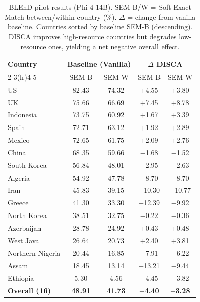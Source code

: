 \documentclass{article}
\newcommand{\gain}[1]{\textcolor{improvegreen}{#1}}
\begin{document}
\begin{table}[h]\centering\scriptsize
\caption{BLEnD pilot results (Phi-4 14B). SEM-B/W = Soft Exact Match between/within country (\%). $\Delta$ = change from vanilla baseline. Countries sorted by baseline SEM-B (descending). DISCA improves high-resource countries but degrades low-resource ones, yielding a net negative overall effect.}
\label{tab:blend_results}
\setlength{\tabcolsep}{3pt}
\begin{tabular}{@{}lcccc@{}}
\toprule
Country & \multicolumn{2}{c}{Baseline (Vanilla)} & \multicolumn{2}{c}{$\Delta$ DISCA} \\
\cmidrule(lr){2-3}\cmidrule(lr){4-5}
        & SEM-B & SEM-W & SEM-B & SEM-W \\
\midrule
US               & 82.43 & 74.32 & \gain{+4.55}  & \gain{+3.80}  \\
UK               & 75.66 & 66.69 & \gain{+7.45}  & \gain{+8.78}  \\
Indonesia        & 73.75 & 60.92 & \gain{+1.67}  & \gain{+3.39}  \\
Spain            & 72.71 & 63.12 & \gain{+1.92}  & \gain{+2.89}  \\
Mexico           & 72.65 & 61.75 & \gain{+2.09}  & \gain{+2.76}  \\
China            & 68.35 & 59.66 & $-$1.68       & $-$1.52       \\
South Korea      & 56.84 & 48.01 & $-$2.95       & $-$2.63       \\
Algeria          & 54.92 & 47.78 & $-$8.70       & $-$8.70       \\
Iran             & 45.83 & 39.15 & $-$10.30      & $-$10.77      \\
Greece           & 41.30 & 33.30 & $-$12.39      & $-$9.92       \\
North Korea      & 38.51 & 32.75 & $-$0.22       & $-$0.36       \\
Azerbaijan       & 28.78 & 24.92 & \gain{+0.43}  & \gain{+0.48}  \\
West Java        & 26.64 & 20.73 & \gain{+2.40}  & \gain{+3.81}  \\
Northern Nigeria & 20.44 & 16.85 & $-$7.91       & $-$6.22       \\
Assam            & 18.45 & 13.14 & $-$13.21      & $-$9.44       \\
Ethiopia         &  5.30 &  4.56 & $-$4.45       & $-$3.82       \\
\midrule
\textbf{Overall (16)} & \textbf{48.91} & \textbf{41.73} & $-$\textbf{4.40} & $-$\textbf{3.28} \\
\bottomrule
\end{tabular}
\end{table}
\end{document}
